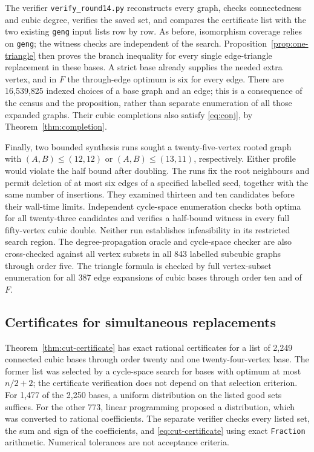 \documentclass[11pt]{article}
\begin{document}
The verifier \texttt{verify\_round14.py} reconstructs every graph,
checks connectedness and cubic degree, verifies the saved set, and
compares the certificate list with the two existing \texttt{geng}
input lists row by row. As before, isomorphism coverage relies on
\texttt{geng}; the witness checks are independent of the search.
Proposition~\ref{prop:one-triangle} then proves the branch inequality
for every single edge-triangle replacement in these bases. A strict
base already supplies the needed extra vertex, and in $F$ the
through-edge optimum is six for every edge. There are 16,539,825
indexed choices of a base graph and an edge; this is a consequence
of the census and the proposition, rather than separate enumeration
of all those expanded graphs. Their cubic completions also satisfy
\eqref{eq:conj}, by Theorem~\ref{thm:completion}.

Finally, two bounded synthesis runs sought a twenty-five-vertex
rooted graph with $(A,B)\leq(12,12)$ or $(A,B)\leq(13,11)$,
respectively. Either profile would violate the half bound after
doubling. The runs fix the root neighbours and permit deletion of
at most six edges of a specified labelled seed, together with the
same number of insertions. They examined thirteen and ten candidates
before their wall-time limits. Independent cycle-space enumeration
checks both optima for all twenty-three candidates and verifies a
half-bound witness in every full fifty-vertex cubic double. Neither
run establishes infeasibility in its restricted search region.
The degree-propagation oracle and cycle-space checker are also
cross-checked against all vertex subsets in all 843 labelled
subcubic graphs through order five. The triangle formula is checked
by full vertex-subset enumeration for all 387 edge expansions of
cubic bases through order ten and of $F$.

\subsection{Certificates for simultaneous replacements}
Theorem~\ref{thm:cut-certificate} has exact rational certificates
for a list of 2,249 connected cubic bases through order twenty and
one twenty-four-vertex base. The former list was selected by a
cycle-space search for bases with optimum at most $n/2+2$; the
certificate verification does not depend on that selection criterion.
For 1,477 of the 2,250 bases, a uniform distribution on the listed
good sets suffices. For the other 773, linear programming
proposed a distribution, which was converted to rational coefficients.
The separate verifier checks every listed set, the sum and sign of
the coefficients, and \eqref{eq:cut-certificate} using exact
\texttt{Fraction} arithmetic. Numerical tolerances are not acceptance
criteria.
\end{document}
